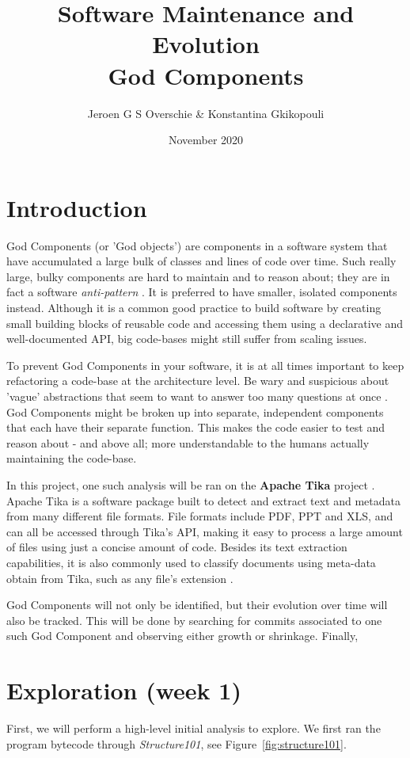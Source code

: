 \documentclass{article}
\title{Software Maintenance and Evolution \\God Components}
\author{Jeroen G S Overschie \& Konstantina Gkikopouli}
\date{November 2020}
\begin{document}
\maketitle

\section{Introduction}
God Components (or 'God objects') are components in a software system that have accumulated a large bulk of classes and lines of code over time. Such really large, bulky components are hard to maintain and to reason about; they are in fact a software \textit{anti-pattern} \citep{smith2000software}. It is preferred to have smaller, isolated components instead. Although it is a common good practice to build software by creating small building blocks of reusable code and accessing them using a declarative and well-documented API, big code-bases might still suffer from scaling issues.

To prevent God Components in your software, it is at all times important to keep refactoring a code-base at the architecture level. Be wary and suspicious about 'vague' abstractions that seem to want to answer too many questions at once \citep{riel1996object}. God Components might be broken up into separate, independent components that each have their separate function. This makes the code easier to test and reason about - and above all; more understandable to the humans actually maintaining the code-base.

In this project, one such analysis will be ran on the \textbf{Apache Tika} project \citep{apache_software_foundation_2020}. Apache Tika is a software package built to detect and extract text and metadata from many different file formats. File formats include PDF, PPT and XLS, and can all be accessed through Tika's API, making it easy to process a large amount of files using just a concise amount of code. Besides its text extraction capabilities, it is also commonly used to classify documents using meta-data obtain from Tika, such as any file's extension \citep{Tika}.

God Components will not only be identified, but their evolution over time will also be tracked. This will be done by searching for commits associated to one such God Component and observing either growth or shrinkage. Finally, 

\section{Exploration (week 1)}
First, we will perform a high-level initial analysis to explore. We first ran the program bytecode through \textit{Structure101}, see Figure~\ref{fig:structure101}.
\end{document}
